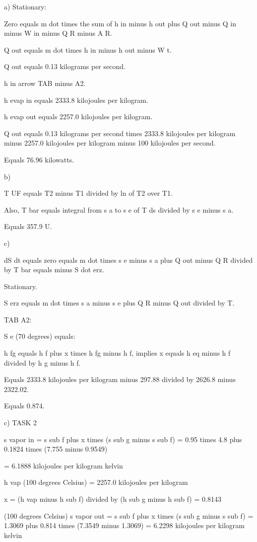 a) Stationary:

Zero equals m dot times the sum of h in minus h out plus Q out minus Q in minus W in minus Q R minus A R.

Q out equals m dot times h in minus h out minus W t.

Q out equals 0.13 kilograms per second.

h in arrow TAB minus A2.

h evap in equals 2333.8 kilojoules per kilogram.

h evap out equals 2257.0 kilojoules per kilogram.

Q out equals 0.13 kilograms per second times 2333.8 kilojoules per kilogram minus 2257.0 kilojoules per kilogram minus 100 kilojoules per second.

Equals 76.96 kilowatts.

b)

T UF equals T2 minus T1 divided by ln of T2 over T1.

Also, T bar equals integral from s a to s e of T ds divided by s e minus s a.

Equals 357.9 U.

c)

dS dt equals zero equals m dot times s e minus s a plus Q out minus Q R divided by T bar equals minus S dot erz.

Stationary.

S erz equals m dot times s a minus s e plus Q R minus Q out divided by T.

TAB A2:

S e (70 degrees) equals:

h fg equals h f plus x times h fg minus h f, implies x equals h eq minus h f divided by h g minus h f.

Equals 2333.8 kilojoules per kilogram minus 297.88 divided by 2626.8 minus 2322.02.

Equals 0.874.

c) TASK 2

s vapor in = s sub f plus x times (s sub g minus s sub f) = 0.95 times 4.8 plus 0.1824 times (7.755 minus 0.9549)

= 6.1888 kilojoules per kilogram kelvin

h vap (100 degrees Celsius) = 2257.0 kilojoules per kilogram

x = (h vap minus h sub f) divided by (h sub g minus h sub f) = 0.8143

(100 degrees Celsius) s vapor out = s sub f plus x times (s sub g minus s sub f) = 1.3069 plus 0.814 times (7.3549 minus 1.3069) = 6.2298 kilojoules per kilogram kelvin

